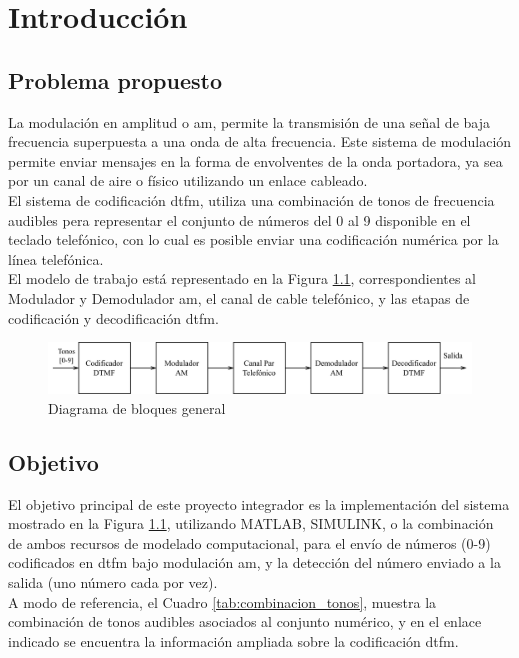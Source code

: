 \chapter{Introducción}
\section{Problema propuesto}
La modulación en amplitud o \gls{am}, permite la transmisión de una señal de baja frecuencia superpuesta a una onda de alta frecuencia. Este sistema de modulación permite enviar mensajes en la forma de envolventes de la onda portadora, ya sea por un canal de aire o físico utilizando un enlace cableado.\\
El sistema de codificación \gls{dtfm}, utiliza una combinación de tonos de frecuencia audibles pera representar el conjunto de números del 0 al 9 disponible en el teclado telefónico, con lo cual es posible enviar una codificación numérica por la línea telefónica.\\
El modelo de trabajo está representado en la Figura \ref{fig:intro_diagrama_bloques}, correspondientes al Modulador y Demodulador \gls{am}, el canal de cable telefónico, y las etapas de codificación y decodificación \gls{dtfm}.

\begin{figure}[ht]
  \centering
  \includegraphics[width=\linewidth]{images/planteamiento/bloques.png}
  \caption{Diagrama de bloques general}
  \label{fig:intro_diagrama_bloques}
\end{figure}

\section{Objetivo}
El objetivo principal de este proyecto integrador es la implementación del sistema mostrado en la Figura \ref{fig:intro_diagrama_bloques}, utilizando MATLAB, SIMULINK, o la combinación de ambos recursos de modelado computacional, para el envío de números (0-9) codificados en \gls{dtfm} bajo modulación \gls{am}, y la detección del número enviado a la salida (uno número cada por vez).\\
A modo de referencia, el Cuadro \ref{tab:combinacion_tonos}, muestra la combinación de tonos audibles asociados al conjunto numérico, y en el enlace indicado se encuentra la información ampliada sobre la codificación \gls{dtfm}.

